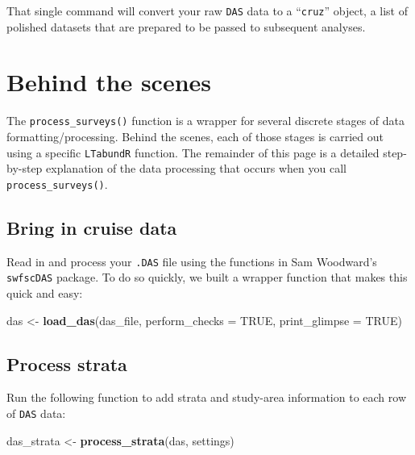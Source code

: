 \documentclass[
]{book}
\newenvironment{Shaded}{\begin{snugshade}}{\end{snugshade}}
\newcommand{\DataTypeTok}[1]{\textcolor[rgb]{0.13,0.29,0.53}{#1}}
\newcommand{\KeywordTok}[1]{\textcolor[rgb]{0.13,0.29,0.53}{\textbf{#1}}}
\newcommand{\NormalTok}[1]{#1}
\newcommand{\OtherTok}[1]{\textcolor[rgb]{0.56,0.35,0.01}{#1}}
\newcommand{\StringTok}[1]{\textcolor[rgb]{0.31,0.60,0.02}{#1}}
\begin{document}
That single command will convert your raw \texttt{DAS} data to a ``\texttt{cruz}'' object, a list of polished datasets that are prepared to be passed to subsequent analyses.

\hypertarget{behind-the-scenes}{%
\section*{Behind the scenes}\label{behind-the-scenes}}

The \texttt{process\_surveys()} function is a wrapper for several discrete stages of data formatting/processing. Behind the scenes, each of those stages is carried out using a specific \texttt{LTabundR} function. The remainder of this page is a detailed step-by-step explanation of the data processing that occurs when you call \texttt{process\_surveys()}.

\hypertarget{bring-in-cruise-data}{%
\subsection*{Bring in cruise data}\label{bring-in-cruise-data}}

Read in and process your \texttt{.DAS} file using the functions in Sam Woodward's \texttt{swfscDAS} package. To do so quickly, we built a wrapper function that makes this quick and easy:

\begin{Shaded}
\begin{Highlighting}[]
\NormalTok{das <-}\StringTok{ }\KeywordTok{load_das}\NormalTok{(das_file, }
                \DataTypeTok{perform_checks =} \OtherTok{TRUE}\NormalTok{,}
                \DataTypeTok{print_glimpse =} \OtherTok{TRUE}\NormalTok{)}
\end{Highlighting}
\end{Shaded}

\hypertarget{process-strata}{%
\subsection*{Process strata}\label{process-strata}}

Run the following function to add strata and study-area information to each row of \texttt{DAS} data:

\begin{Shaded}
\begin{Highlighting}[]
\NormalTok{das_strata <-}\StringTok{ }\KeywordTok{process_strata}\NormalTok{(das, settings)}
\end{Highlighting}
\end{Shaded}
\end{document}
